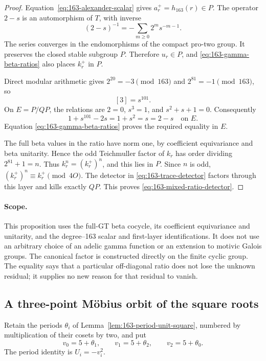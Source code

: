 \begin{proof}
Equation~\eqref{eq:163-alexander-scalar} gives \(a_r^+=h_{163}(r)\in P\).
The operator \(2-s\) is an automorphism of \(T\), with inverse
\[
 (2-s)^{-1}=-\sum_{m\geq0}2^m s^{-m-1}.
\]
The series converges in the endomorphisms of the compact pro-two
group.  It preserves the closed stable subgroup \(P\).  Therefore
\(u_r\in P\), and \eqref{eq:163-gamma-beta-ratios} also places \(k_r^+\) in \(P\).

Direct modular arithmetic gives \(2^{20}=-3\pmod {163}\) and
\(2^{81}=-1\pmod {163}\), so
\[
 [3]=s^{101}.
\]
On \(E=P/QP\), the relations are \(2=0\), \(s^3=1\), and
\(s^2+s+1=0\).  Consequently
\[
 1+s^{101}-2s=1+s^2=s=2-s
                 \quad\text{on }E.
\]
Equation \eqref{eq:163-gamma-beta-ratios} proves the required equality in \(E\).

The full beta values in the ratio have norm one, by coefficient
equivariance and beta unitarity.  Hence the odd Teichmuller factor
of \(k_r\) has order dividing \(2^{81}+1=n\).  Thus
\(k_r^n=(k_r^+)^n\), and this lies in \(P\).  Since \(n\) is
odd, \((k_r^+)^n\equiv k_r^+\pmod {4O}\).  The detector in \eqref{eq:163-trace-detector}
factors through this layer and kills exactly \(QP\).
This proves \eqref{eq:163-mixed-ratio-detector}.
\end{proof}

\paragraph{Scope.}
This proposition uses the full-GT beta cocycle, its coefficient
equivariance and unitarity, and the degree--163 scalar and
first-layer identifications.  It does not use an arbitrary choice of
an adelic gamma function or an extension to motivic Galois groups.
The canonical factor is constructed directly on the finite cyclic
group.  The equality says that a particular off-diagonal ratio does
not lose the unknown residual; it supplies no new reason for that
residual to vanish.

\subsection{A three-point M\"obius orbit of the square roots}

Retain the periods \(\theta_i\) of
Lemma~\ref{lem:163-period-unit-square}, numbered by multiplication
of their cosets by two, and put
\[
 v_0=5+\theta_1,\qquad v_1=5+\theta_2,\qquad
 v_2=5+\theta_0.
\]
The period identity is \(U_i=-v_i^2\).

